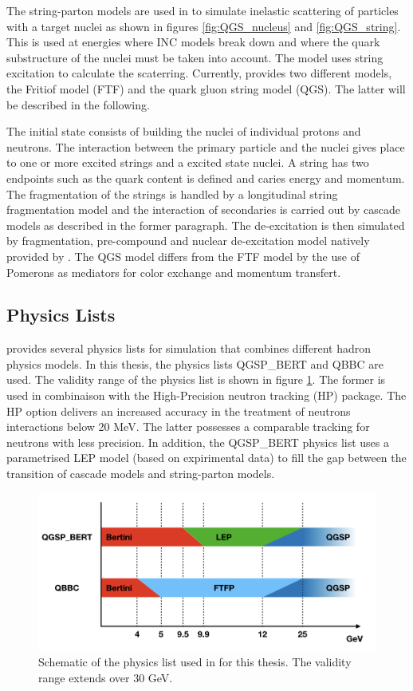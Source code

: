 The string-parton models \cite{Folger2003} are used in \geant to simulate inelastic scattering of particles with a target nuclei as shown in figures \ref{fig:QGS_nucleus} and \ref{fig:QGS_string}. This is used at energies where INC models break down and where the quark substructure of the nuclei must be taken into account. The model uses string excitation to calculate the scaterring. Currently, \geant provides two different models, the Fritiof model (FTF) and the quark gluon string model (QGS). The latter will be described in the following.

The initial state consists of building the nuclei of individual protons and neutrons. The interaction between the primary particle and the nuclei gives place to one or more excited strings and a excited state nuclei. A string has two endpoints such as the quark content is defined and caries energy and momentum. The fragmentation of the strings is handled by a longitudinal string fragmentation model and the interaction of secondaries is carried out by cascade models as described in the former paragraph. The de-excitation is then simulated by fragmentation, pre-compound and nuclear de-excitation model natively provided by \geant. The QGS model differs from the FTF model by the use of Pomerons as mediators for color exchange and momentum transfert.

\subsection{\geant Physics Lists}

\geant provides several physics lists for simulation that combines different hadron physics models. In this thesis, the physics lists QGSP\_BERT and QBBC are used. The validity range of the physics list is shown in figure \ref{fig:physics_list}. The former is used in combinaison with the High-Precision neutron tracking (HP) package. The HP option delivers an increased accuracy in the treatment of neutrons interactions below 20 MeV. The latter possesses a comparable tracking for neutrons with less precision.
In addition, the QGSP\_BERT physics list uses a parametrised LEP model (based on expirimental data) to fill the gap between the transition of cascade models and string-parton models.

\begin{figure}[t]
  \centering
  \includegraphics[width=1.\linewidth]{chap4/fig/PhysicsLists.jpeg}
  \caption{Schematic of the physics list used in \geant for this thesis. The validity range extends over 30 GeV.} \label{fig:physics_list}
\end{figure}

